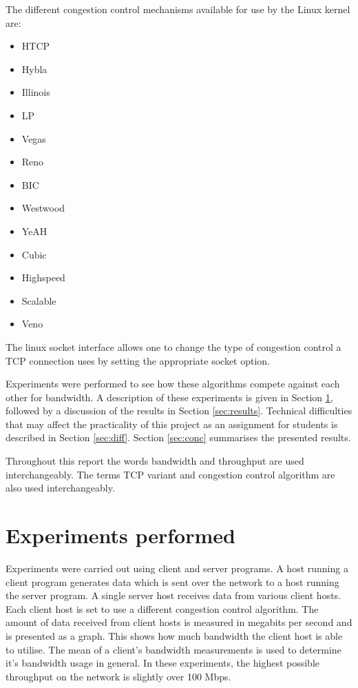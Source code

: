 \documentclass[11pt,a4paper,twocolumn]{article}
\begin{document}
The different congestion control mechanisms available for use by the Linux kernel are:
\begin{itemize}
\item HTCP
\item Hybla
\item Illinois
\item LP
\item Vegas
\item Reno
\item BIC
\item Westwood
\item YeAH
\item Cubic
\item Highspeed
\item Scalable
\item Veno
\end{itemize}
The linux socket interface allows one to change the type of congestion control a TCP connection uses by setting
the appropriate socket option.

Experiments were
performed to see how these algorithms compete against each other for bandwidth. A description
of these experiments is given in Section \ref{sec:exp}, followed by a discussion of the results in Section \ref{sec:results}.
Technical difficulties that may affect the practicality of this project as an assignment for students is described
in Section \ref{sec:diff}. Section \ref{sec:conc} summarises the presented results.

Throughout this report the words bandwidth and throughput are used interchangeably. The terms TCP variant and
congestion control algorithm are also used interchangeably.

\section{Experiments performed}
\label{sec:exp}
Experiments were carried out using client and server programs. A host running a client program generates data which is sent over the
network to a host running the server program. A single server host receives data from various client hosts. Each client host is set to use a different congestion control algorithm.
The amount of data received from client hosts is measured in megabits per second and is presented as a graph. This shows how much bandwidth the client host is able to utilise.
The mean of a client's bandwidth measurements is used to determine it's bandwidth usage in general. In these experiments, the highest possible throughput on the
network is slightly over 100 Mbps.
\end{document}
